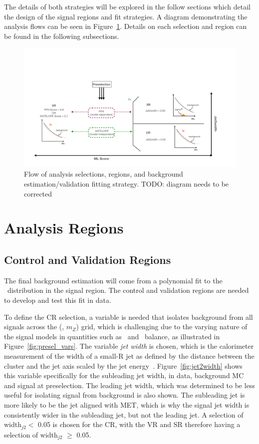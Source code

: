 The details of both strategies will be explored in the follow sections which detail the design of the signal regions and fit strategies.
A diagram demonstrating the analysis flows can be seen in Figure~\ref{fig:analysisflow}.
Details on each selection and region can be found in the following subsections.
\begin{figure}[!htbp]
\centering
    \includegraphics[width=1.1\textwidth]{figures/eventsel/analysisflow_vr}
    \caption{Flow of analysis selections, regions, and background estimation/validation fitting strategy. TODO: diagram needs to be corrected
    \label{fig:analysisflow}}
\end{figure}

\section{Analysis Regions}
\subsection{Control and Validation Regions}
\label{subec:sel_crvr}

The final background estimation will come from a polynomial fit to the \mt~distribution in the signal region.
The control and validation regions are needed to develop and test this fit in data.
 
To define the CR selection, a variable is needed that isolates background from all signals across the (\rinv, $m_Z$) grid, which is challenging due to the varying nature of the signal models in quantities such as \met~and \pt~balance, as illustrated in Figure~\ref{fig:presel_vars}. 
The variable \textit{jet width} is chosen, which is the calorimeter measurement of the width of a small-R jet as defined by the distance between the cluster and the jet axis scaled by the jet energy~\cite{jetwidth}.
Figure~\ref{fig:jet2width} shows this variable specifically for the subleading jet width, in data, background MC and signal at preselection.
The leading jet width, which was determined to be less useful for isolating signal from background is also shown.
The subleading jet is more likely to be the jet aligned with MET, which is why the signal jet width is consistently wider in the subleading jet, but not the leading jet.  %
A selection of width$_{j2} <$ 0.05 is chosen for the CR, with the VR and SR therefore having a selection of width$_{j2}$ $\geq$ 0.05.
 
